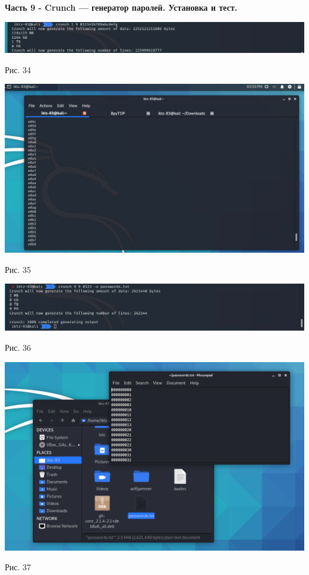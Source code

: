 \documentclass[a4paper,14pt]{extarticle}
\begin{document}
    \textbf{Часть 9 - Crunch — генератор паролей. Установка и тест.}
    \begin{center}

        \includegraphics[scale=0.4]{pics/34.png}

        Рис. 34 

        \includegraphics[scale=0.4]{pics/35.png}

        Рис. 35 

        \includegraphics[scale=0.4]{pics/36.png}

        Рис. 36 

        \includegraphics[scale=0.4]{pics/37.png}

        Рис. 37 

   \end{center}
\end{document}
